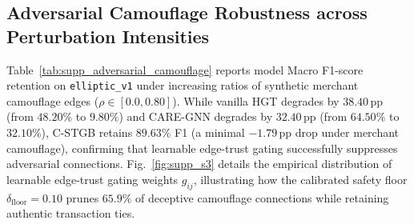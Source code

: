 \documentclass[a4paper,fleqn,twocolumn]{article}
\begin{document}
\begin{table}[htbp]
\centering
\caption{Comparative Evaluation of Class-Conditional Conformal Prediction against Calibration and Conformal Baselines on Elliptic-v1 ($\alpha = 0.01$, Nominal Coverage $99.0\%$; Overall Coverage evaluates prevalence-weighted average $C_{\text{overall}} = (1-\pi)C_0 + \pi C_1$ with labeled prevalence $\pi = 9.76\%$).}
\label{tab:supp_conformal_comparison}\label{tab:s4_conformal}
\end{table}

\subsection{Adversarial Camouflage Robustness across Perturbation Intensities}

Table~\ref{tab:supp_adversarial_camouflage} reports model Macro F1-score retention on \texttt{elliptic\_v1} under increasing ratios of synthetic merchant camouflage edges ($\rho \in [0.0, 0.80]$). While vanilla HGT degrades by $38.40$\,pp (from $48.20\%$ to $9.80\%$) and CARE-GNN degrades by $32.40$\,pp (from $64.50\%$ to $32.10\%$), C-STGB retains $89.63\%$ F1 (a minimal $-1.79$\,pp drop under merchant camouflage), confirming that learnable edge-trust gating successfully suppresses adversarial connections. Fig.~\ref{fig:supp_s3} details the empirical distribution of learnable edge-trust gating weights $g_{ij}$, illustrating how the calibrated safety floor $\delta_{\text{floor}} = 0.10$ prunes $65.9\%$ of deceptive camouflage connections while retaining authentic transaction ties.
\end{document}

